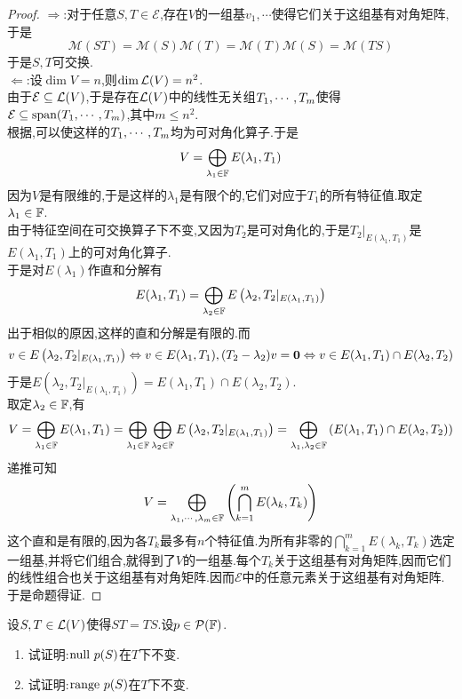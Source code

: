 \documentclass{ctexart}
\begin{document}
\begin{proof}
    $\Rightarrow$:对于任意$S,T\in\mathcal{E}$,存在$V$的一组基$v_1,\cdots$使得它们关于这组基有对角矩阵,于是
    \[\mathcal{M}(ST)=\mathcal{M}(S)\mathcal{M}(T)=\mathcal{M}(T)\mathcal{M}(S)=\mathcal{M}(TS)\]
    于是$S,T$可交换.\\
    $\Leftarrow$:设$\dim V=n$,则$\dim\mathcal{L}(V)=n^2$.\\
    由于$\mathcal{E}\subseteq\mathcal{L}(V)$,于是存在$\mathcal{L}(V)$中的线性无关组${T}_1,\cdots,{T}_{m}$使得$\mathcal{E}\subseteq\text{span}({T}_1,\cdots,{T}_{m})$,其中$m\leqslant n^2$.\\
    根据,可以使这样的${T}_1,\cdots,{T}_{m}$均为可对角化算子.于是
    \[V=\bigoplus_{\lambda_1\in\mathbb{F}} E(\lambda_{1},T_1)\]
    因为$V$是有限维的,于是这样的$\lambda_{1}$是有限个的,它们对应于$T_1$的所有特征值.取定$\lambda_1\in\mathbb{F}$.\\
    由于特征空间在可交换算子下不变,又因为$T_2$是可对角化的,于是$T_2|_{E(\lambda_1,T_1)}$是$E(\lambda_1,T_1)$上的可对角化算子.\\
    于是对$E(\lambda_1)$作直和分解有
    \[E(\lambda_1,T_1)=\bigoplus_{\lambda_2\in\mathbb{F}}E\left(\lambda_2,T_2|_{E(\lambda_1,T_1)}\right)\]
    出于相似的原因,这样的直和分解是有限的.而
    \[v\in E\left(\lambda_2,T_2|_{E(\lambda_1,T_1)}\right)\Leftrightarrow v\in E(\lambda_1,T_1),(T_2-\lambda_2)v=\mathbf0\Leftrightarrow v\in E(\lambda_1,T_1)\cap E(\lambda_2,T_2)\]
    于是$E\left(\lambda_2,T_2|_{E(\lambda_1,T_1)}\right)=E(\lambda_1,T_1)\cap E(\lambda_2,T_2)$.\\
    取定$\lambda_2\in\mathbb{F}$,有
    \[V=\bigoplus_{\lambda_1\in\mathbb{F}} E(\lambda_{1},T_1)=\bigoplus_{\lambda_1\in\mathbb{F}}\bigoplus_{\lambda_2\in\mathbb{F}}E\left(\lambda_2,T_2|_{E(\lambda_1,T_1)}\right)=\bigoplus_{\lambda_1,\lambda_2\in\mathbb{F}}\left(E(\lambda_1,T_1)\cap E(\lambda_2,T_2)\right)\]
    递推可知
    \[V=\bigoplus_{{\lambda}_1,\cdots,{\lambda}_{m}\in\mathbb{F}}\left(\bigcap_{k=1}^{m}E(\lambda_k,T_k)\right)\]
    这个直和是有限的,因为各$T_k$最多有$n$个特征值.为所有非零的$\displaystyle \bigcap_{k=1}^{m}E(\lambda_k,T_k)$选定一组基,并将它们组合,就得到了$V$的一组基.每个$T_k$关于这组基有对角矩阵,因而它们的线性组合也关于这组基有对角矩阵.因而$\mathcal{E}$中的任意元素关于这组基有对角矩阵.于是命题得证.
\end{proof}
\begin{problem}[3.]
    设$S,T\in\mathcal{L}(V)$使得$ST=TS$.设$p\in\mathcal{P}(\mathbb{F})$.
    \begin{enumerate}[label=\tbf{(\arabic*)}]
        \item 试证明:$\text{null } p(S)$在$T$下不变.
        \item 试证明:$\text{range } p(S)$在$T$下不变.
    \end{enumerate}
\end{problem}
\end{document}
